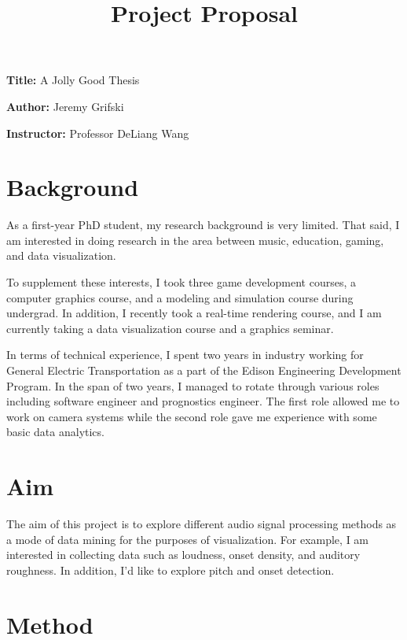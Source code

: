 \documentclass[12pt, a4paper]{article}
\title{Project Proposal}
\author{}
\date{}
\newcommand{\namelistlabel}[1]{\mbox{#1}\hfil}
\newenvironment{namelist}[1]{%
\begin{list}{}
    {
        \let\makelabel\namelistlabel
        \settowidth{\labelwidth}{#1}
        \setlength{\leftmargin}{1.1\labelwidth}
    }
  }{%
\end{list}}
\begin{document}
\maketitle

\begin{namelist}{xxxxxxxxxxxx}
\item[{\bf Title:}]
	A Jolly Good Thesis
\item[{\bf Author:}]
	Jeremy Grifski
\item[{\bf Instructor:}]
	Professor DeLiang Wang
\end{namelist}

\section*{Background}

As a first-year PhD student, my research background is very limited. That said,
I am interested in doing research in the area between music, education, gaming,
and data visualization.

To supplement these interests, I took three game development courses, a
computer graphics course, and a modeling and simulation course during undergrad.
In addition, I recently took a real-time rendering course, and I am
currently taking a data visualization course and a graphics seminar.

In terms of technical experience, I spent two years in industry working for
General Electric Transportation as a part of the Edison Engineering Development
Program. In the span of two years, I managed to rotate through various roles
including software engineer and prognostics engineer. The first role allowed
me to work on camera systems while the second role gave me experience with
some basic data analytics.

\section*{Aim}

The aim of this project is to explore different audio signal processing methods
as a mode of data mining for the purposes of visualization. For example, I am
interested in collecting data such as loudness, onset density, and auditory
roughness. In addition, I'd like to explore pitch and onset detection.

\section*{Method}
\end{document}
